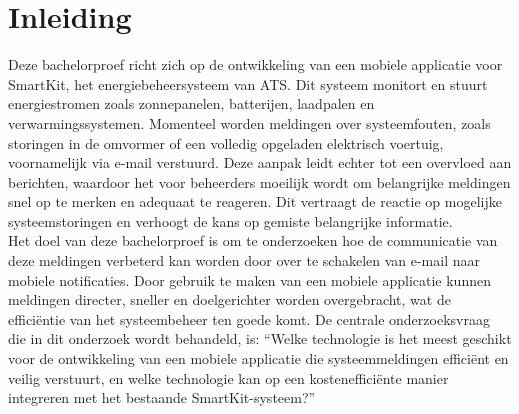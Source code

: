


% 

\section{Inleiding}%
\label{sec:inleiding}

\noindent Deze bachelorproef richt zich op de ontwikkeling van een mobiele applicatie voor SmartKit, het energiebeheersysteem van ATS. Dit systeem monitort en stuurt energiestromen zoals zonnepanelen, batterijen, laadpalen en verwarmingssystemen. Momenteel worden meldingen over systeemfouten, zoals storingen in de omvormer of een volledig opgeladen elektrisch voertuig, voornamelijk via e-mail verstuurd. Deze aanpak leidt echter tot een overvloed aan berichten, waardoor het voor beheerders moeilijk wordt om belangrijke meldingen snel op te merken en adequaat te reageren. Dit vertraagt de reactie op mogelijke systeemstoringen en verhoogt de kans op gemiste belangrijke informatie. \\

\noindent Het doel van deze bachelorproef is om te onderzoeken hoe de communicatie van deze meldingen verbeterd kan worden door over te schakelen van e-mail naar mobiele notificaties. Door gebruik te maken van een mobiele applicatie kunnen meldingen directer, sneller en doelgerichter worden overgebracht, wat de efficiëntie van het systeembeheer ten goede komt. De centrale onderzoeksvraag die in dit onderzoek wordt behandeld, is: “Welke technologie is het meest geschikt voor de ontwikkeling van een mobiele applicatie die systeemmeldingen efficiënt en veilig verstuurt, en welke technologie kan op een kostenefficiënte manier integreren met het bestaande SmartKit-systeem?” \\

